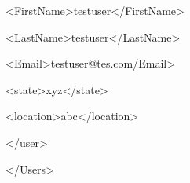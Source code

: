 \noindent 
{\fontsize{10pt}{10pt}\selectfont  \hspace*{0.5in}  \hspace*{0.5in} <FirstName>testuser</FirstName>} \par
\noindent 
{\fontsize{10pt}{10pt}\selectfont  \hspace*{0.5in}  \hspace*{0.5in} <LastName>testuser</LastName>} \par
\noindent 
{\fontsize{10pt}{10pt}\selectfont  \hspace*{0.5in}  \hspace*{0.5in} <Email>testuser@tes.com/Email>} \par
\noindent 
{\fontsize{10pt}{10pt}\selectfont  \hspace*{0.5in}  \hspace*{0.5in} <state>xyz</state>} \par
\noindent 
{\fontsize{10pt}{10pt}\selectfont  \hspace*{0.5in}  \hspace*{0.5in} <location>abc</location>} \par
\noindent 
{\fontsize{10pt}{10pt}\selectfont  \hspace*{0.5in} </user>} \par
\noindent 
{\fontsize{10pt}{10pt}\selectfont </Users>} \par
\vspace{12pt}
